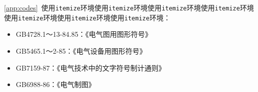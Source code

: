 \label{app:codes}
\cref{app:codes}~使用\verb|itemize|环境使用\verb|itemize|环境使用\verb|itemize|环境使用\verb|itemize|环境使用\verb|itemize|环境使用\verb|itemize|环境使用\verb|itemize|环境：
\begin{itemize}
	\item GB4728.1～13-84.85：《电气图用图形符号》
	\item GB5465.1～2-85：《电气设备用图形符号》
	\item GB7159-87：《电气技术中的文字符号制计通则》
	\item GB6988-86：《电气制图》	
\end{itemize}